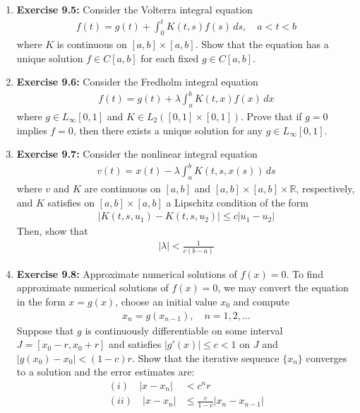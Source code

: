 \documentclass[aspectratio=169,10pt]{beamer}
\begin{document}
\begin{frame}[allowframebreaks]
\begin{enumerate}
    \vspace{0.3cm}

    \item \textbf{Exercise 9.5:} Consider the Volterra integral equation
    \begin{align*}
    f(t) = g(t) + \int_0^t K(t, s) f(s) \, ds, \quad a < t < b
    \end{align*}
    where $K$ is continuous on $[a,b] \times [a,b]$. Show that the equation has
    a unique solution $f \in C[a,b]$ for each fixed $g \in C[a,b]$.

    \vspace{0.3cm}

    \item \textbf{Exercise 9.6:} Consider the Fredholm integral equation
    \begin{align*}
    f(t) = g(t) + \lambda \int_a^b K(t,x) f(x) \, dx
    \end{align*}
    where $g \in L_\infty[0,1]$ and $K \in L_2([0,1] \times [0,1])$. Prove that if
    $g = 0$ implies $f = 0$, then there exists a unique solution for any $g \in L_\infty[0,1]$.

\framebreak

    \item \textbf{Exercise 9.7:} Consider the nonlinear integral equation
    \begin{align*}
    v(t) = x(t) - \lambda \int_a^b K(t, s, x(s)) \, ds
    \end{align*}
    where $v$ and $K$ are continuous on $[a,b]$ and $[a,b] \times [a,b] \times \mathbb{R}$,
    respectively, and $K$ satisfies on $[a,b] \times [a,b]$ a Lipschitz condition of the form
    \begin{align*}
    |K(t, s, u_1) - K(t, s, u_2)| \leq c|u_1 - u_2|
    \end{align*}
    Then, show that
    \begin{align*}
    |\lambda| < \frac{1}{c(b-a)}
    \end{align*}

    \vspace{0.3cm}

    \item \textbf{Exercise 9.8:} Approximate numerical solutions of $f(x) = 0$.
    To find approximate numerical solutions of $f(x) = 0$, we may convert the
    equation in the form $x = g(x)$, choose an initial value $x_0$ and compute
    \begin{align*}
    x_n = g(x_{n-1}), \quad n = 1, 2, \ldots
    \end{align*}
    Suppose that $g$ is continuously differentiable on some interval $J = [x_0 - r, x_0 + r]$
    and satisfies $|g'(x)| \leq c < 1$ on $J$ and $|g(x_0) - x_0| < (1-c)r$. Show that the
    iterative sequence $\{x_n\}$ converges to a solution and the error estimates are:
    \begin{align*}
    (i) \quad |x - x_n| &< c^n r\\
    (ii) \quad |x - x_n| &\leq \frac{c}{1-c}|x_n - x_{n-1}|
    \end{align*}


\end{enumerate}
\end{frame}
\end{document}
